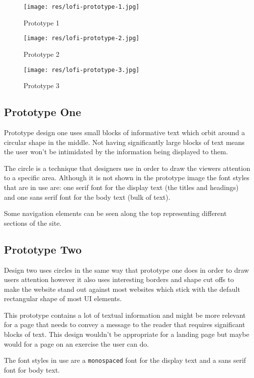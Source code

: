 \begin{figure}[!htb]
  \texttt{[image: res/lofi-prototype-1.jpg]}
  \caption{Prototype 1}\label{fig:lofi-prototype-1}
  \endminipage\hfill
  \texttt{[image: res/lofi-prototype-2.jpg]}
  \caption{Prototype 2}\label{fig:lofi-prototype-2}
  \endminipage\hfill
  \texttt{[image: res/lofi-prototype-3.jpg]}
  \caption{Prototype 3}\label{fig:lofi-prototype-3}
  \endminipage
\end{figure}

\subsection{Prototype One}

Prototype design one uses small blocks of informative text which orbit around a circular shape in the middle. Not having significantly large blocks of text means the user won't be intimidated by the information being displayed to them.

The circle is a technique that designers use in order to draw the viewers attention to a specific area. Although it is not shown in the prototype image the font styles that are in use are: one serif font for the display text (the titles and headings) and one sans serif font for the body text (bulk of text).

Some navigation elements can be seen along the top representing different sections of the site.

\subsection{Prototype Two}

Design two uses circles in the same way that prototype one does in order to draw users attention however it also uses interesting borders and shape cut offs to make the website stand out against most websites which stick with the default rectangular shape of most UI elements.

This prototype contains a lot of textual information and might be more relevant for a page that needs to convey a message to the reader that requires significant blocks of text. This design wouldn't be appropriate for a landing page but maybe would for a page on an exercise the user can do.

The font styles in use are a \texttt{monospaced} font for the display text and a sans serif font for body text.

